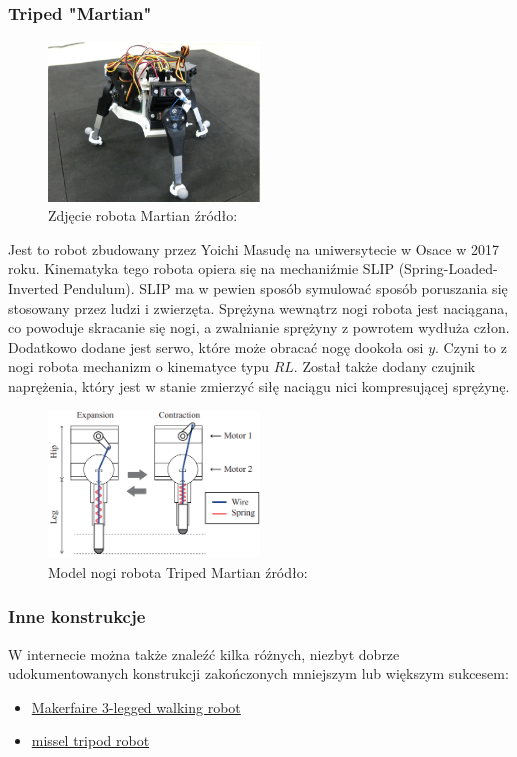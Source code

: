 \documentclass[a4paper,13pt]{article}
\begin{document}
\subsubsection{Triped "Martian" }
\begin{figure}[H]
\centering
\includegraphics[width=0.5\textwidth]{img/martian_photo.png}
\caption{Zdjęcie robota Martian źródło: \cite{Triped Martian}}
\label{martian_photo}
\end{figure}
Jest to robot zbudowany przez Yoichi Masudę na uniwersytecie w Osace w 2017 roku. Kinematyka tego robota opiera się na mechaniźmie SLIP (Spring-Loaded-Inverted Pendulum). SLIP ma w pewien sposób symulować sposób poruszania się stosowany przez ludzi i zwierzęta. Sprężyna wewnątrz nogi robota jest naciągana, co powoduje skracanie się nogi, a zwalnianie sprężyny z powrotem wydłuża człon. Dodatkowo dodane jest serwo, które może obracać nogę dookoła osi $y$. Czyni to z nogi robota mechanizm o kinematyce typu $RL$. Został także dodany czujnik naprężenia, który jest w stanie zmierzyć siłę naciągu nici kompresującej sprężynę. \cite{Triped Martian}\\

\begin{figure}[H]
\centering
\includegraphics[width=0.5\textwidth]{img/martian_model.png}
\caption{Model nogi robota Triped Martian źródło: \cite{Triped Martian}}
\label{martian_leg}
\end{figure}

\subsubsection{Inne konstrukcje}
W internecie można także znaleźć kilka różnych, niezbyt dobrze udokumentowanych konstrukcji zakończonych mniejszym lub większym sukcesem:
\begin{itemize}
\item \href{https://makerfaire.com/maker/entry/71669/}{Makerfaire 3-legged walking robot}
\item \href{https://youtu.be/HGEhCCUgFMg}{missel tripod robot}
\end{itemize}
\end{document}
